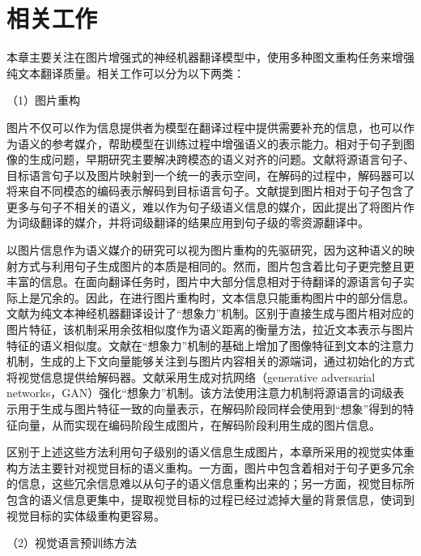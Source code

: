 \section{相关工作}
本章主要关注在图片增强式的神经机器翻译模型中，使用多种图文重构任务来增强纯文本翻译质量。相关工作可以分为以下两类：

{\sffamily （1）图片重构}

图片不仅可以作为信息提供者为模型在翻译过程中提供需要补充的信息，也可以作为语义的参考媒介，帮助模型在训练过程中增强语义的表示能力。相对于句子到图像的生成问题，早期研究主要解决跨模态的语义对齐的问题。文献\cite{54_DBLP:journals/mt/NakayamaN17}将源语言句子、目标语言句子以及图片映射到一个统一的表示空间，在解码的过程中，解码器可以将来自不同模态的编码表示解码到目标语言句子。文献\cite{55_DBLP:conf/ijcai/ChenJF19}提到图片相对于句子包含了更多与句子不相关的语义，难以作为句子级语义信息的媒介，因此提出了将图片作为词级翻译的媒介，并将词级翻译的结果应用到句子级的零资源翻译中。

以图片信息作为语义媒介的研究可以视为图片重构的先驱研究，因为这种语义的映射方式与利用句子生成图片的本质是相同的。然而，图片包含着比句子更完整且更丰富的信息。在面向翻译任务时，图片中大部分信息相对于待翻译的源语言句子实际上是冗余的。因此，在进行图片重构时，文本信息只能重构图片中的部分信息。文献\cite{37_elliott-kadar-2017-imagination}为纯文本神经机器翻译设计了“想象力”机制。区别于直接生成与图片相对应的图片特征，该机制采用余弦相似度作为语义距离的衡量方法，拉近文本表示与图片特征的语义相似度。文献\cite{56_zhou-etal-2018-visual}在“想象力”机制的基础上增加了图像特征到文本的注意力机制，生成的上下文向量能够关注到与图片内容相关的源端词，通过初始化的方式将视觉信息提供给解码器。文献\cite{51_long-etal-2021-generative}采用生成对抗网络（generative adversarial networks，GAN）强化“想象力”机制。该方法使用注意力机制将源语言的词级表示用于生成与图片特征一致的向量表示，在解码阶段同样会使用到“想象”得到的特征向量，从而实现在编码阶段生成图片，在解码阶段利用生成的图片信息。

区别于上述这些方法利用句子级别的语义信息生成图片，本章所采用的视觉实体重构方法主要针对视觉目标的语义重构。一方面，图片中包含着相对于句子更多冗余的信息，这些冗余信息难以从句子的语义信息重构出来的；另一方面，视觉目标所包含的语义信息更集中，提取视觉目标的过程已经过滤掉大量的背景信息，使词到视觉目标的实体级重构更容易。


{\sffamily （2）视觉语言预训练方法}

